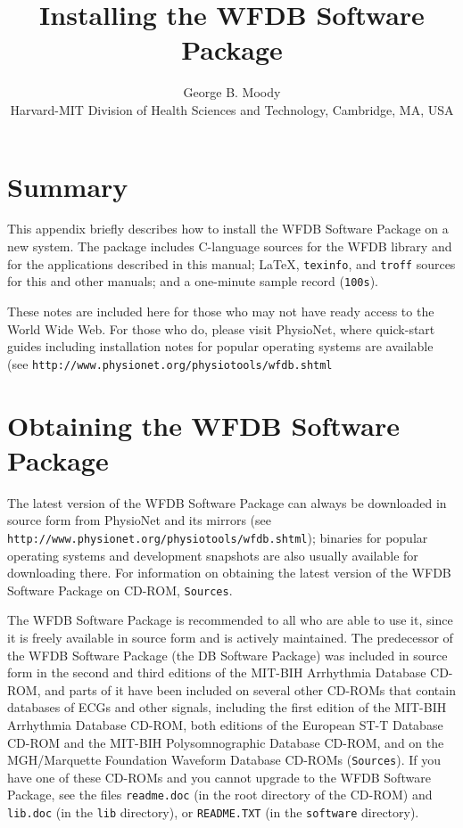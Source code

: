 \documentclass[twoside]{article}
\title{Installing the WFDB Software Package}
\author{George B. Moody\\
Harvard-MIT Division of Health Sciences and Technology, Cambridge, MA, USA}
\date{}
\begin{document}
\setcounter{page}{114}

\maketitle

\section*{Summary}
This appendix briefly describes how to install the WFDB Software Package on a
new system.  The package includes C-language sources for the WFDB library and
for the applications described in this manual; \LaTeX{}, {\tt texinfo}, and
{\tt troff} sources for this and other manuals; and a one-minute sample record
({\tt 100s}).

These notes are included here for those who may not have ready access to the
World Wide Web.  For those who do, please visit PhysioNet, where quick-start
guides including installation notes for popular operating systems are available
(see {\tt http://www.physio\-net.org/physio\-tools/wfdb.shtml}

\section*{Obtaining the WFDB Software Package}
The latest version of the WFDB Software Package can always be downloaded in
source form from PhysioNet and its mirrors (see
{\tt http://www.physio\-net.org/physio\-tools/wfdb.shtml}); binaries for
popular operating systems and development snapshots are also usually available
for downloading there.  For information on obtaining the latest version of the
WFDB Software Package on CD-ROM, {\tt Sources}.

The WFDB Software Package is recommended to all who are able to use it, since
it is freely available in source form and is actively maintained.  The
predecessor of the WFDB Software Package (the DB Software Package) was included
in source form in the second and third editions of the MIT-BIH Arrhythmia
Database CD-ROM, and parts of it have been included on several other CD-ROMs
that contain databases of ECGs and other signals, including the first edition
of the MIT-BIH Arrhythmia Database CD-ROM, both editions of the European ST-T
Database CD-ROM and the MIT-BIH Polysomnographic Database CD-ROM, and on the
MGH/Marquette Foundation Waveform Database CD-ROMs ({\tt Sources}).  If you
have one of these CD-ROMs and you cannot upgrade to the WFDB Software Package,
see the files {\tt readme.doc} (in the root directory of the CD-ROM) and
{\tt lib.doc} (in the {\tt lib} directory), or {\tt README.TXT} (in the
{\tt software} directory).
\end{document}
